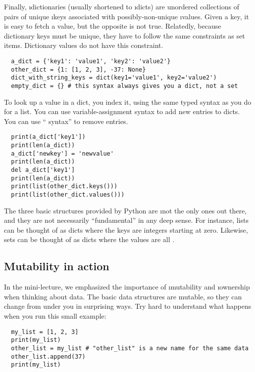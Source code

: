 \documentclass[letterpaper, 12pt, titlepage, twoside]{article}
\begin{document}
Finally, \i{dictionaries} (usually shortened to \i{dicts}) are unordered
collections of pairs of unique \i{keys} associated with possibly-non-unique
\i{values}. Given a key, it is easy to fetch a value, but the opposite is not
true. Relatedly, because dictionary keys must be unique, they have to follow
the same constraints as set items. Dictionary values do not have this
constraint.

\begin{lstlisting}
  a_dict = {'key1': 'value1', 'key2': 'value2'}
  other_dict = {1: [1, 2, 3], -37: None}
  dict_with_string_keys = dict(key1='value1', key2='value2')
  empty_dict = {} # this syntax always gives you a dict, not a set
\end{lstlisting}

To look up a value in a dict, you index it, using the same typed syntax as you
do for a list. You can use variable-assignment syntax to add new entries to
dicts. You can use `` syntax'' to remove entries.

\begin{lstlisting}
  print(a_dict['key1'])
  print(len(a_dict))
  a_dict['newkey'] = 'newvalue'
  print(len(a_dict))
  del a_dict['key1']
  print(len(a_dict))
  print(list(other_dict.keys()))
  print(list(other_dict.values()))
\end{lstlisting}

The three basic structures provided by Python are \i{not} the only ones out
there, and they are not necessarily ``fundamental'' in any deep sense. For
instance, lists can be thought of as dicts where the keys are integers
starting at zero. Likewise, sets can be thought of as dicts where the values
are all .

\subsection*{Mutability in action}

In the mini-lecture, we emphasized the importance of \i{mutability} and
\i{ownership} when thinking about data. The basic data structures are mutable,
so they can change from under you in surprising ways. Try hard to understand
what happens when you run this small example:

\begin{lstlisting}
  my_list = [1, 2, 3]
  print(my_list)
  other_list = my_list # "other_list" is a new name for the same data
  other_list.append(37)
  print(my_list)
\end{lstlisting}
\end{document}
